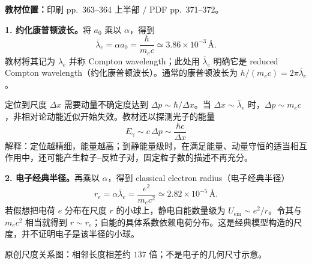 \textbf{教材位置：}印刷 pp.~363--364 上半部 / PDF pp.~371--372。

\textbf{1. 约化康普顿波长。}将 $a_0$ 乘以 $\alpha$，得到
\begin{equation}
  \boxed{\bar\lambda_e=\alpha a_0=\frac{\hbar}{m_ec}
    \simeq3.86\times10^{-3}\,\text{\AA}.}
\end{equation}
教材将其记为 $\lambda_e$ 并称 Compton wavelength；此处用 $\bar\lambda_e$ 明确它是 reduced Compton wavelength（约化康普顿波长）。通常的康普顿波长为 $h/(m_ec)=2\pi\bar\lambda_e$。

定位到尺度 $\Delta x$ 需要动量不确定度达到 $\Delta p\sim\hbar/\Delta x$。当 $\Delta x\sim\bar\lambda_e$ 时，$\Delta p\sim m_ec$，非相对论动能近似开始失效。教材还以探测光子的能量
\begin{equation}
  E_\gamma\sim c\,\Delta p\sim\frac{\hbar c}{\Delta x}
\end{equation}
解释：定位越精细，能量越高；到静能量级时，在满足能量、动量守恒的适当相互作用中，还可能产生粒子--反粒子对，固定粒子数的描述不再充分。


\textbf{2. 电子经典半径。}再乘以 $\alpha$，得到 classical electron radius（电子经典半径）
\begin{equation}
  \boxed{r_e=\alpha\bar\lambda_e=\frac{e^2}{m_ec^2}
       \simeq2.82\times10^{-5}\,\text{\AA}.}
\end{equation}
若假想把电荷 $e$ 分布在尺度 $r$ 的小球上，静电自能数量级为 $U_{\mathrm{em}}\sim e^2/r$。令其与 $m_ec^2$ 相当就得到 $r\sim r_e$；自能的具体系数依赖电荷分布。这是经典模型构造的尺度，并不证明电子是该半径的小球。

\begin{center}
\begin{minipage}{\linewidth}
\centering
{}

\small 原创尺度关系图：相邻长度相差约 $137$ 倍；不是电子的几何尺寸示意。
\end{minipage}
\end{center}

